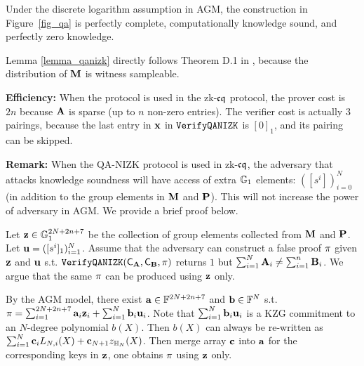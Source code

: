 \begin{lemma}
\label{lemma_qanizk}
\cite[Appendix D]{LegoSnarkFull}
Under the discrete logarithm assumption in 
AGM, the construction in 
Figure\ \ref{fig_qa} is perfectly complete,
computationally knowledge sound, and
perfectly zero knowledge.
\end{lemma}

Lemma \ref{lemma_qanizk} directly follows
Theorem D.1 in \cite[Appendix D]{LegoSnarkFull},
because the distribution of ${{\mathbf {M}}}$ is
witness sampleable.

{\bf Efficiency:} When the protocol is used in
the zk-${\mathfrak{cq}}$ protocol, the prover cost is $2n$ because
${{\mathbf {A}}}$ is sparse (up to $n$ non-zero entries).
The verifier cost is actually $3$ pairings, because
the last entry in ${{\mathbf {x}}}$ in $\texttt{VerifyQANIZK}$
is $[0]_1$, and its pairing can be skipped.

{\bf Remark:} When the QA-NIZK protocol is used in
zk-${\mathfrak{cq}}$, the adversary that attacks knowledge soundness
will have access of extra ${\mathbb{G}}_1$ elements:
$([s^i])_{i=0}^N$ (in addition to the group elements
in ${{\mathbf {M}}}$ and ${{\mathbf {P}}}$). This will not increase
the power of adversary in AGM. We provide a brief proof
below.

Let ${{\mathbf {z}}} \in {\mathbb{G}}_1^{2N+2n+7}$ 
be the collection of group elements
collected from ${{\mathbf {M}}}$ and ${{\mathbf {P}}}$.
Let ${{\mathbf {u}}} = ([s^i]_1)_{i=1}^N$. Assume that
the adversary can construct a false 
proof $\pi$ given ${{\mathbf {z}}}$ and ${{\mathbf {u}}}$
s.t. $\texttt{VerifyQANIZK}({\mathsf{C}}_{{\mathbf {A}}}, {\mathsf{C}}_{{\mathbf {B}}}, \pi)$
returns $1$ but 
$\sum_{i=1}^N {{\mathbf {A}}}_i \neq \sum_{i=1}^n {{\mathbf {B}}}_i$.
We argue that the same $\pi$ can be produced using
${{\mathbf {z}}}$ only.

By the AGM model, there exist
${{\mathbf {a}}} \in \mathbb{F}^{2N+2n+7}$ and
${{\mathbf {b}}} \in \mathbb{F}^{N}$ s.t.
$\pi = \sum_{i=1}^{2N+2n+7} {{\mathbf {a}}}_i {{\mathbf {z}}}_i  
 + \sum_{i=1}^{N} {{\mathbf {b}}}_i {{\mathbf {u}}}_i$.
Note that $\sum_{i=1}^N {{\mathbf {b}}}_i {{\mathbf {u}}}_i$ 
is a KZG commitment to an $N$-degree polynomial $b(X)$.
Then $b(X)$ can always be re-written
as $\sum_{i=1}^{N} {{\mathbf {c}}}_i L_{N,i}(X) + {{\mathbf {c}}}_{N+1} z_{\mathbb{H}_{N}}(X)$.
Then merge array ${{\mathbf {c}}}$ into
${{\mathbf {a}}}$ for the corresponding keys in
${{\mathbf {z}}}$, one obtains $\pi$
using ${{\mathbf {z}}}$ only. 



